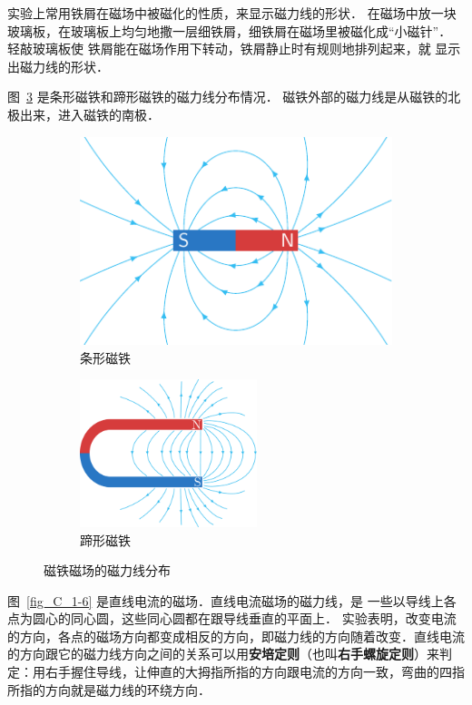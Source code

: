 实验上常用铁屑在磁场中被磁化的性质，来显示磁力线的形状．
在磁场中放一块玻璃板，在玻璃板上均匀地撒一层细铁屑，细铁屑在磁场里被磁化成“小磁针”．
轻敲玻璃板使
铁屑能在磁场作用下转动，铁屑静止时有规则地排列起来，就
显示出磁力线的形状．



图~\ref{fig_C_1-5} 是条形磁铁和蹄形磁铁的磁力线分布情况．
磁铁外部的磁力线是从磁铁的北极出来，进入磁铁的南极．


\begin{figure}[htbp]
	\centering
	\begin{subfigure}{0.4\linewidth}
		\centering
		\includegraphics{fig/C/1-5a.pdf}
		\caption{条形磁铁}\label{fig_C_1-5a}
	\end{subfigure}
	\hfil
	\begin{subfigure}{0.4\linewidth}
		\centering
		\includegraphics[height=4.3cm]{fig/C/1-5b.pdf}
		\caption{蹄形磁铁}\label{fig_C_1-5b}
	\end{subfigure}
	\caption{磁铁磁场的磁力线分布}\label{fig_C_1-5}
\end{figure}





图~\ref{fig_C_1-6} 是直线电流的磁场．直线电流磁场的磁力线，是
一些以导线上各点为圆心的同心圆，这些同心圆都在跟导线垂直的平面上．
实验表明，改变电流的方向，各点的磁场方向都变成相反的方向，即磁力线的方向随着改变．直线电流的方向跟它的磁力线方向之间的关系可以用\textbf{安培定则}（也叫\textbf{右手螺旋定则}）来判定：用右手握住导线，让伸直的大拇指所指的方向跟电流的方向一致，弯曲的四指所指的方向就是磁力线的环绕方向．


